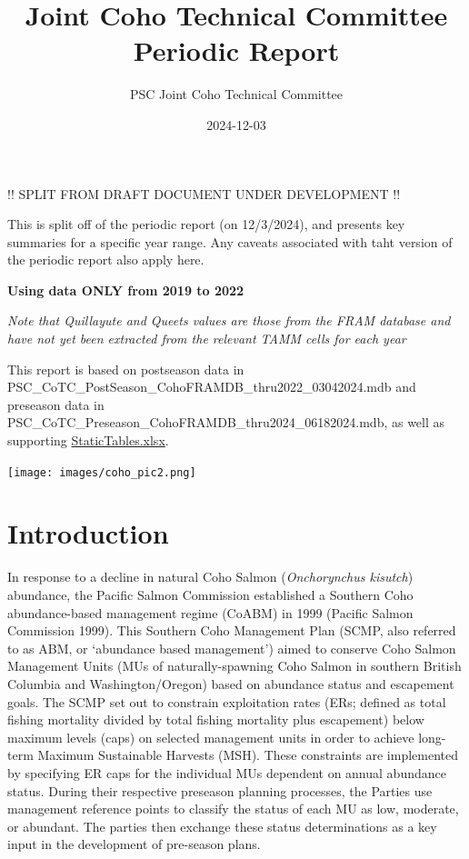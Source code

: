 \documentclass[
  letterpaper,
  DIV=11,
  numbers=noendperiod]{scrartcl}
\title{Joint Coho Technical Committee Periodic Report}
\author{PSC Joint Coho Technical Committee}
\date{2024-12-03}
\renewcommand*\contentsname{Table of contents}
\newcommand\contentsname{Table of contents}
\begin{document}
\maketitle

\renewcommand*\contentsname{Table of contents}
{
\hypersetup{linkcolor=}
\setcounter{tocdepth}{4}
\tableofcontents
}

!! SPLIT FROM DRAFT DOCUMENT UNDER DEVELOPMENT !!

This is split off of the periodic report (on 12/3/2024), and presents
key summaries for a specific year range. Any caveats associated with
taht version of the periodic report also apply here.

\textbf{Using data ONLY from 2019 to 2022}

\emph{Note that Quillayute and Queets values are those from the FRAM
database and have not yet been extracted from the relevant TAMM cells
for each year}

This report is based on postseason data in
PSC\_CoTC\_PostSeason\_CohoFRAMDB\_thru2022\_03042024.mdb and preseason
data in PSC\_CoTC\_Preseason\_CohoFRAMDB\_thru2024\_06182024.mdb, as
well as supporting
\href{https://github.com/PSC-CoTC/PeriodicReport/blob/master/StaticTables.xlsx}{StaticTables.xlsx}.

\texttt{[image: images/coho\_pic2.png]}

\section{Introduction}\label{introduction}

In response to a decline in natural Coho Salmon (\emph{Onchorynchus
kisutch}) abundance, the Pacific Salmon Commission established a
Southern Coho abundance-based management regime (CoABM) in 1999 (Pacific
Salmon Commission 1999). This Southern Coho Management Plan (SCMP, also
referred to as ABM, or `abundance based management') aimed to conserve
Coho Salmon Management Units (MUs of naturally-spawning Coho Salmon in
southern British Columbia and Washington/Oregon) based on abundance
status and escapement goals. The SCMP set out to constrain exploitation
rates (ERs; defined as total fishing mortality divided by total fishing
mortality plus escapement) below maximum levels (caps) on selected
management units in order to achieve long-term Maximum Sustainable
Harvests (MSH). These constraints are implemented by specifying ER caps
for the individual MUs dependent on annual abundance status. During
their respective preseason planning processes, the Parties use
management reference points to classify the status of each MU as low,
moderate, or abundant. The parties then exchange these status
determinations as a key input in the development of pre-season plans.
\end{document}
